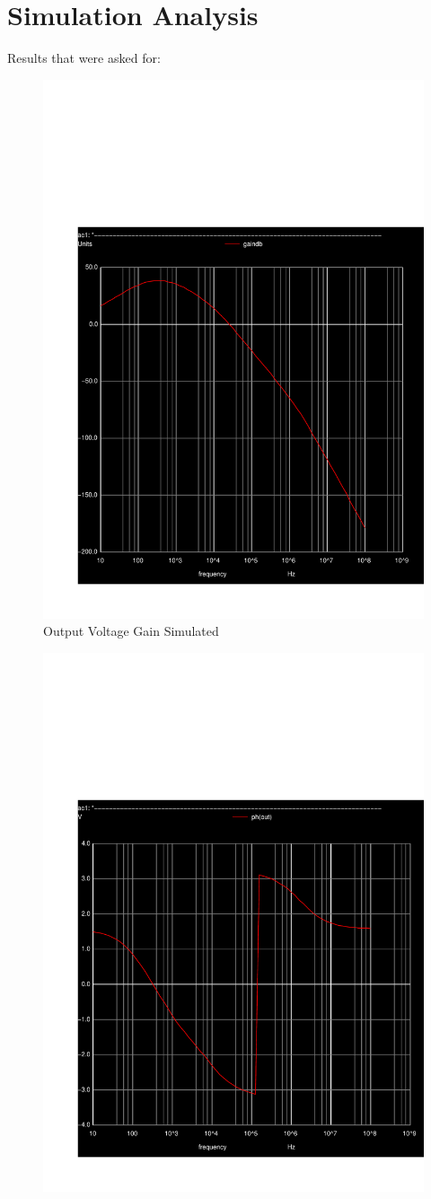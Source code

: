 \clearpage

\section{Simulation Analysis}
\label{sec:simulation}

Results that were asked for:

\begin{figure}[H] \centering
\includegraphics[width=0.5\linewidth]{../sim/gain.pdf}
\caption{Output Voltage Gain Simulated}
\label{fig:sim-gain}
\end{figure}

\begin{figure}[H] \centering
\includegraphics[width=0.5\linewidth]{../sim/phase.pdf}
\end{figure}

